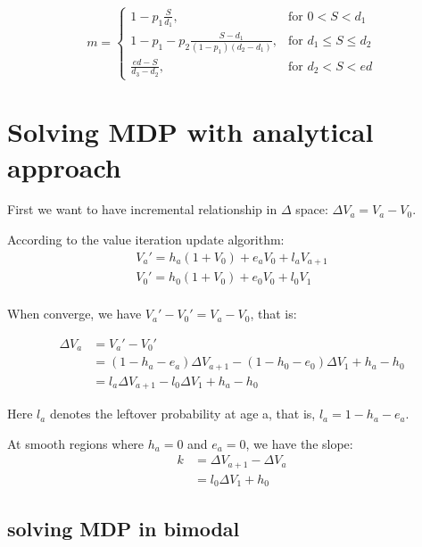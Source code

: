 \documentclass[12pt, letterpaper]{article}
\begin{document}
\[
m = \left\{\begin{array}{lr}
      1-p_1\frac{S}{d_1}, & \text{for } 0 < S < d_1 \\
      1-p_1-p_2\frac{S-d_1}{(1-p_1)(d_2-d_1)}, & \text{for } d_1 \leq S \leq d_2 \\
      \frac{ed-S}{d_3-d_2}, & \text{for } d_2 < S < ed
           \end{array}
           \right.
\]

\section{Solving MDP with analytical approach}

First we want to have incremental relationship in $\Delta$ space: $\Delta V_a = V_a - V_0$.

According to the value iteration update algorithm:
\begin{equation}
\begin{aligned}
V_a' = h_a (1+V_0) + e_a V_0 + l_a V_{a+1} \\
V_0' = h_0 (1+V_0) + e_0 V_0 + l_0 V_1 \\
\end{aligned}
\end{equation}

When converge, we have $V_a' - V_0' = V_a - V_0 $, that is:

\begin{equation}
\begin{aligned}
\Delta V_a & = V_a' - V_0' \\
 & = (1-h_a-e_a) \Delta V_{a+1} - (1-h_0-e_0) \Delta V_1 + h_a - h_0 \\
 & = l_a \Delta V_{a+1} - l_0 \Delta V_1 + h_a - h_0 
\end{aligned}
\end{equation}

Here $l_a$ denotes the leftover probability at age a, that is, $l_a = 1- h_a -
e_a$.

At smooth regions where $h_a = 0$ and $e_a = 0$, we have the slope:
\begin{equation}
\label{eq:slope}
\begin{aligned}
k & = \Delta V_{a+1} - \Delta V_a \\
& = l_0 \Delta V_1 + h_0
\end{aligned}
\end{equation}

\subsection{solving MDP in bimodal}
\end{document}
